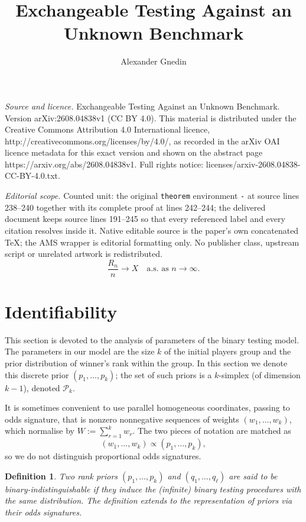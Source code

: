 \documentclass[10pt,a4paper]{amsart}
\newtheorem{definition}[theorem]{Definition}
\numberwithin{equation}{section}
\begin{document}
\title[Exchangeable Testing Against an Unknown Benchmark]{Exchangeable Testing Against an Unknown Benchmark}
\author{Alexander Gnedin}
\date{}
\maketitle
\noindent\emph{Source and licence.} Exchangeable Testing Against an Unknown Benchmark. Version arXiv:2608.04838v1 (CC BY 4.0). This material is distributed under the Creative Commons Attribution 4.0 International licence, http://creativecommons.org/licenses/by/4.0/, as recorded in the arXiv OAI licence metadata for this exact version and shown on the abstract page https://arxiv.org/abs/2608.04838v1. Full rights notice: licenses/arxiv-2608.04838-CC-BY-4.0.txt.\par\smallskip
\noindent\textit{Editorial scope.} Counted unit: the original \texttt{theorem} environment \texttt{-} at source lines 238--240 together with its complete proof at lines 242--244; the delivered document keeps source lines 191--245 so that every referenced label and every citation resolves inside it. Native editable source is the paper's own concatenated TeX; the AMS wrapper is editorial formatting only. No publisher class, upstream script or unrelated artwork is redistributed.
\begin{equation}\label{eq:LLN}
\frac{R_n}{n}\to X\quad\text{a.s.\ as }n\to\infty.
\end{equation}

\section{Identifiability}

This section is devoted to the analysis of parameters of the binary testing model. The parameters in our model are the size \(k\) of the initial players group and the prior distribution of winner's rank within the group. In this section we denote this discrete prior \((p_1,\dots,p_k)\); the set of such priors is a \(k\)-simplex (of dimension \(k-1\)), denoted \(\mathcal{P}_k\).

It is sometimes convenient to use parallel homogeneous coordinates, passing to odds signature, that is nonzero nonnegative sequences of weights \((w_1,\dots,w_k)\), which normalise by \(W:=\sum_{r=1}^k w_r\). The two pieces of notation are matched as
\[
(w_1,\dots,w_k)\propto(p_1,\dots,p_k),
\]
so we do not distinguish proportional odds signatures.

\begin{definition}
Two rank priors \((p_1,\dots,p_k)\) and \((q_1,\dots,q_\ell)\) are said to be binary-indistinguishable if they induce the (infinite) binary testing procedures with the same distribution. The definition extends to the representation of priors via their odds signatures.
\end{definition}
\end{document}
